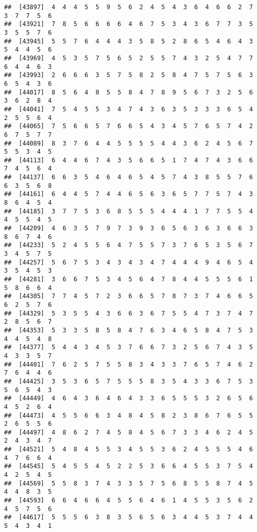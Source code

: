 \documentclass[
]{book}
\begin{document}
\begin{verbatim}
##  [43897]  4  4  4  5  5  9  5  6  2  4  5  4  3  6  4  6  6  2  7  3  7  7  5  6
##  [43921]  7  8  5  6  6  6  6  4  6  7  5  3  4  3  6  7  7  3  5  3  5  5  7  6
##  [43945]  5  5  7  6  4  4  4  3  5  8  5  2  8  6  5  4  6  4  3  5  4  4  5  6
##  [43969]  4  5  3  5  7  5  6  5  2  5  5  7  4  3  2  5  4  7  7  6  4  4  6  3
##  [43993]  2  6  6  6  3  5  7  5  8  2  5  8  4  7  5  7  5  6  3  6  5  4  3  6
##  [44017]  8  5  6  4  8  5  5  8  4  7  8  9  5  6  7  3  2  5  6  3  6  2  8  4
##  [44041]  7  5  4  5  5  3  4  7  4  3  6  3  5  3  3  3  6  5  4  2  5  5  6  4
##  [44065]  7  5  6  6  5  7  6  6  5  4  3  4  5  7  6  5  7  4  2  6  7  5  7  7
##  [44089]  8  3  7  6  4  4  5  5  5  5  4  4  3  6  2  4  5  6  7  5  5  3  4  5
##  [44113]  6  4  4  6  7  4  3  5  6  6  5  1  7  4  7  4  3  6  6  7  4  5  6  4
##  [44137]  6  6  3  5  4  6  4  6  5  4  5  7  4  3  8  5  5  7  6  6  3  5  6  8
##  [44161]  6  4  4  5  7  4  4  6  5  6  3  6  5  7  7  5  7  4  3  8  6  4  5  4
##  [44185]  3  7  7  5  3  6  8  5  5  5  4  4  4  1  7  7  5  5  4  4  5  5  4  5
##  [44209]  4  6  3  5  7  9  7  3  9  3  6  5  6  3  6  3  6  6  3  8  6  7  4  6
##  [44233]  5  2  4  5  5  6  4  7  5  5  7  3  7  6  5  3  5  6  7  3  4  5  7  5
##  [44257]  5  6  7  5  3  4  3  4  3  4  7  4  4  4  9  4  6  5  4  3  5  4  5  3
##  [44281]  3  6  6  7  5  3  4  5  6  4  7  8  4  4  5  5  5  6  1  5  8  6  6  4
##  [44305]  7  7  4  5  7  2  3  6  6  5  7  8  7  3  7  4  6  6  5  6  2  5  7  6
##  [44329]  5  3  5  5  4  3  6  6  3  6  7  5  5  4  7  3  7  4  7  2  8  5  6  7
##  [44353]  5  3  3  5  8  5  8  4  7  6  3  4  6  5  8  4  7  5  3  4  4  5  4  8
##  [44377]  5  4  4  3  4  5  3  7  6  6  7  3  2  5  6  7  4  3  5  4  3  3  5  7
##  [44401]  7  6  2  5  7  5  5  8  3  4  3  3  7  6  5  7  4  6  2  7  6  4  4  6
##  [44425]  3  5  3  6  5  7  5  5  5  8  3  5  4  3  3  6  7  5  3  5  6  5  4  3
##  [44449]  4  6  4  3  6  4  6  4  3  3  6  5  5  5  3  2  6  5  6  4  5  2  6  4
##  [44473]  4  5  5  6  6  3  4  8  4  5  8  2  3  8  6  7  6  5  5  2  6  5  5  6
##  [44497]  4  8  6  2  7  4  5  8  4  5  6  7  3  3  4  6  2  4  5  2  4  3  4  7
##  [44521]  5  4  8  4  5  5  3  4  5  5  3  6  2  4  5  5  5  4  6  4  7  6  6  4
##  [44545]  5  4  5  5  4  5  2  2  5  3  6  6  4  5  5  3  7  5  4  4  2  5  4  5
##  [44569]  5  5  8  3  7  4  3  3  5  7  5  6  8  5  5  8  7  4  5  4  4  8  3  5
##  [44593]  6  6  4  6  6  4  5  5  6  4  6  1  4  5  5  3  5  6  2  4  5  7  5  6
##  [44617]  5  5  5  6  3  8  3  5  6  5  6  3  4  4  5  3  7  4  4  5  4  3  4  1

\end{verbatim}
\end{document}
